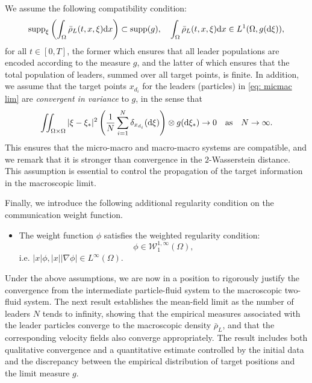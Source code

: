 \documentclass[10pt, reqno]{amsart}
\theoremstyle{definition}
\theoremstyle{remark}
\numberwithin{equation}{section}
\newcommand{\dx}{\textnormal{d}x}
\newcommand{\dxi}{\textnormal{d}\xi}
\newcommand{\calW}{\mathcal W}
\begin{document}
We assume the following compatibility condition:
\[%
\textnormal{supp}_\xi \left(\int_\Omega \bar\rho_L(t,x,\xi)\dx\right) \subset \textnormal{supp}(g),\quad \int_\Omega \bar\rho_L(t,x,\xi)\dx \in L^1(\Omega,g(\dxi)),
\]%
for all $t\in [0,T]$, the former which ensures that all leader populations are encoded according to the measure $g$, and the latter of which ensures that the total population of leaders, summed over all target points, is finite. In addition, we assume that the target points $x_{d_i}$ for the leaders (particles) in \eqref{eq: micmac lim} are \textit{convergent in variance} to $g$, in the sense that
\[%
    \iint_{\Omega \times \Omega} |\xi - \xi_*|^2 \left(\frac{1}{N}\sum_{i=1}^N \delta_{x_{d_i}}(\dxi) \right) \otimes g(\dxi_*) \to 0 \quad \text{as}\quad N\to\infty.
\]%
This ensures that the micro-macro and macro-macro systems are compatible, and we remark that it is stronger than convergence in the $2$-Wasserstein distance. This assumption is essential to control the propagation of the target information in the macroscopic limit.

Finally, we introduce the following additional regularity condition on the communication weight function.
\begin{itemize}
\item[{\bf (A4)}] The weight function $\phi$ satisfies the weighted regularity condition:
\[
\phi \in \calW^{1,\infty}_1(\Omega),
\]
i.e. $|x|\phi, |x||\nabla \phi| \in L^\infty(\Omega)$.
\end{itemize} 

 Under the above assumptions, we are now in a position to rigorously justify the convergence from the intermediate particle-fluid system to the macroscopic two-fluid system. The next result establishes the mean-field limit as the number of leaders $N$ tends to infinity, showing that the empirical measures associated with the leader particles converge to the macroscopic density $\bar \rho_L$, and that the corresponding velocity fields also converge appropriately. The result includes both qualitative convergence and a quantitative estimate controlled by the initial data and the discrepancy between the empirical distribution of target positions and the limit measure $g$.
\end{document}
